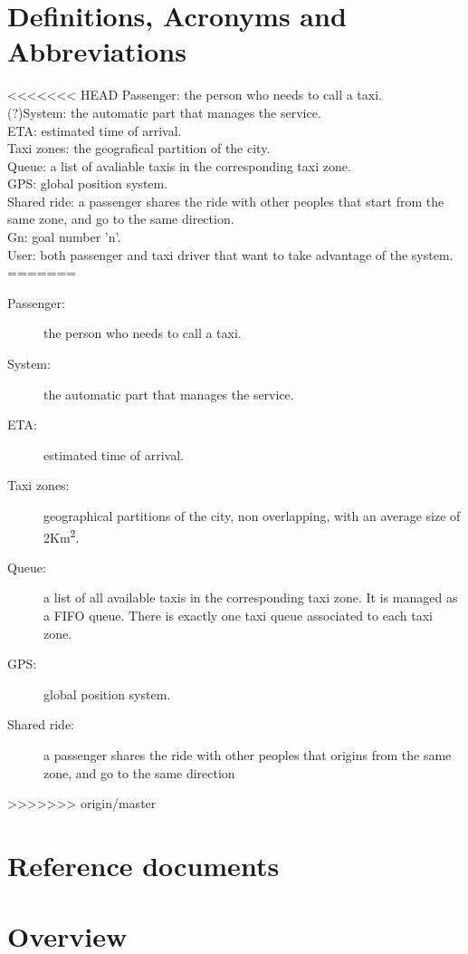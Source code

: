 \documentclass[a4paper,11pt]{report}
\begin{document}
\section{Definitions, Acronyms and Abbreviations}
<<<<<<< HEAD
Passenger: the person who needs to call a taxi.\\
(?)System: the automatic part that manages the service.\\
ETA: estimated time of arrival.\\
Taxi zones: the geografical partition of the city.\\
Queue: a list of avaliable taxis in the corresponding taxi zone.\\
GPS: global position system.\\
Shared ride: a passenger shares the ride with other peoples that start from the same zone, and go to the same direction.\\
Gn: goal number 'n'.\\
User: both passenger and taxi driver that want to take advantage of the system.
=======
\begin{description}
  \item[Passenger:] the person who needs to call a taxi.  %
  \item[System:] the automatic part that manages the service.  %
  \item[ETA:] estimated time of arrival.
  \item[Taxi zones:] geographical partitions of the city, non overlapping, with an average size of 2Km\textsuperscript{2}.
  \item[Queue:] a list of all available taxis in the corresponding taxi zone. It is managed as a FIFO queue.
    There is exactly one taxi queue associated to each taxi zone.
  \item[GPS:] global position system.
  \item[Shared ride:] a passenger shares the ride with other peoples that origins from the same zone, and go to the same direction
\end{description}
>>>>>>> origin/master
 
\section{Reference documents}

\section{Overview}
\end{document}
